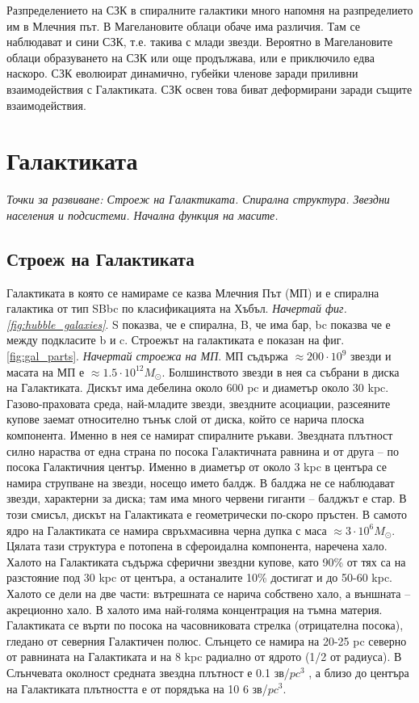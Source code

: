 \documentclass[a4paper,12pt]{article}
\begin{document}
Разпределението на СЗК в спиралните галактики много напомня на разпределието им в Млечния път. В Магелановите облаци обаче има различия. Там се наблюдават и сини СЗК, т.е. такива с млади звезди. Вероятно в Магелановите облаци образуването на СЗК или още продължава, или е приключило едва наскоро. СЗК еволюират динамично, губейки членове заради приливни взаимодействия с Галактиката. СЗК освен това биват деформирани заради същите взаимодействия.


\section{Галактиката}
\textit{Точки за развиване: Строеж на Галактиката. Спирална структура. Звездни населения и подсистеми. Начална функция на масите.}

\subsection{Строеж на Галактиката}
Галактиката в която се намираме се казва Млечния Път (МП) и е спирална галактика от тип SBbc по класификацията на Хъбъл. \textit{Начертай фиг. \ref{fig:hubble_galaxies}}. S показва, че е спирална, B, че има бар, bc показва че е между подкласите b и c. Строежът на галактиката е показан на фиг. \ref{fig:gal_parts}. \textit{Начертай строежа на МП}. МП съдържа $\approx 200 \cdot 10^9$ звезди и масата на МП е $\approx 1.5 \cdot 10^{12} M_\odot$. Болшинството звезди в нея са събрани в диска на Галактиката. Дискът има дебелина около 600 pc и диаметър около 30 kpc. Газово-праховата среда, най-младите звезди, звездните асоциации, разсеяните купове заемат относително тънък слой от диска, който се нарича плоска компонента. Именно в нея се намират спиралните ръкави. Звездната плътност силно нараства от една страна по посока Галактичната равнина и от друга – по посока Галактичния център. Именно в диаметър от около 3 kpc в центъра се намира струпване на звезди, носещо името балдж. В балджа не се наблюдават звезди, характерни за диска; там има много червени гиганти – балджът е стар. В този смисъл, дискът на Галактиката е геометрически по-скоро пръстен. В самото ядро на Галактиката се намира свръхмасивна черна дупка с маса $\approx 3\cdot 10^6 M_\odot$. Цялата тази структура е потопена в сфероидална компонента, наречена хало. Халото на Галактиката съдържа сферични звездни купове, като 90\% от тях са на разстояние под 30 kpc от центъра, а останалите 10\% достигат и до 50-60 kpc. Халото се дели на две части: вътрешната се нарича собствено хало, а външната – акреционно хало. В халото има най-голяма концентрация на тъмна материя. Галактиката се върти по посока на часовниковата стрелка (отрицателна посока), гледано от северния Галактичен полюс. Слънцето се намира на 20-25 pc северно от равнината на Галактиката и на 8 kpc радиално от ядрото (1/2 от радиуса). В Слънчевата околност средната звездна плътност е 0.1 зв/$pc^3$ , а близо до центъра на Галактиката плътността е от порядъка на 10 6 зв/$pc^3$. 
\end{document}
